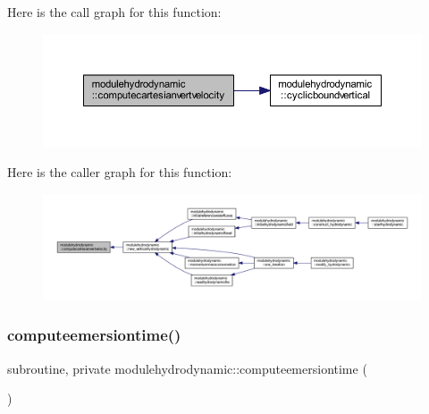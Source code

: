 Here is the call graph for this function\+:\nopagebreak
\begin{figure}[H]
\begin{center}
\leavevmode
\includegraphics[width=350pt]{namespacemodulehydrodynamic_a6063cff17a8575e5ea95e38e9a14da2d_cgraph}
\end{center}
\end{figure}
Here is the caller graph for this function\+:\nopagebreak
\begin{figure}[H]
\begin{center}
\leavevmode
\includegraphics[width=350pt]{namespacemodulehydrodynamic_a6063cff17a8575e5ea95e38e9a14da2d_icgraph}
\end{center}
\end{figure}
\mbox{\label{namespacemodulehydrodynamic_a15232a4b6e4a92f5147fcf1428ebe0c0}} 
\subsubsection{\texorpdfstring{computeemersiontime()}{computeemersiontime()}}
{\footnotesize\ttfamily subroutine, private modulehydrodynamic\+::computeemersiontime (\begin{DoxyParamCaption}{ }\end{DoxyParamCaption})\hspace{0.3cm}{\ttfamily [private]}}

